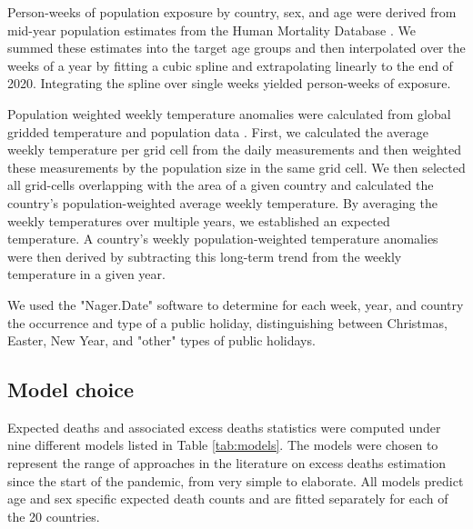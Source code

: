 \documentclass[12pt]{article}
\begin{document}

Person-weeks of population exposure by country, sex, and age were derived from mid-year population estimates from the Human Mortality Database \citep{HMD2021}. We summed these estimates into the target age groups and then interpolated over the weeks of a year by fitting a cubic spline and extrapolating linearly to the end of 2020. Integrating the spline over single weeks yielded person-weeks of exposure.


Population weighted weekly temperature anomalies were calculated from global gridded temperature \citep{CPC2021} and population data \citep{CIESIN2018}. First, we calculated the average weekly temperature per grid cell from the daily measurements and then weighted these measurements by the population size in the same grid cell. We then selected all grid-cells overlapping with the area of a given country and calculated the country's population-weighted average weekly temperature. By averaging the weekly temperatures over multiple years, we established an expected temperature. A country's weekly population-weighted temperature anomalies were then derived by subtracting this long-term trend from the weekly temperature in a given year.


We used the "Nager.Date" software \citep{Hager2021} to determine for each week, year, and country the occurrence and type of a public holiday, distinguishing between Christmas, Easter, New Year, and "other" types of public holidays.

\subsection*{Model choice}

Expected deaths and associated excess deaths statistics were computed under nine different models listed in Table \ref{tab:models}. The models were chosen to represent the range of approaches in the literature on excess deaths estimation since the start of the pandemic, from very simple to elaborate. All models predict age and sex specific expected death counts and are fitted separately for each of the 20 countries.
\end{document}

